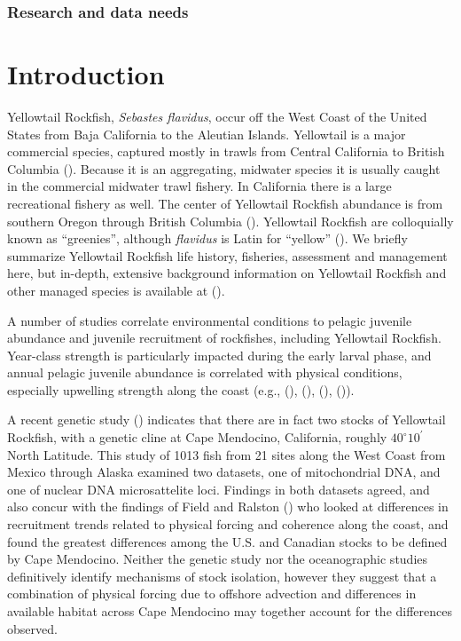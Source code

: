 \documentclass[
]{scrartcl}
\begin{document}
\subsubsection{Research and data needs}\label{research-and-data-needs}

\newpage{}

\section{Introduction}\label{introduction}

Yellowtail Rockfish, \emph{Sebastes flavidus}, occur off the West Coast
of the United States from Baja California to the Aleutian Islands.
Yellowtail is a major commercial species, captured mostly in trawls from
Central California to British Columbia (). Because it is an aggregating, midwater species it is usually
caught in the commercial midwater trawl fishery. In California there is
a large recreational fishery as well. The center of Yellowtail Rockfish
abundance is from southern Oregon through British Columbia
(). Yellowtail Rockfish
are colloquially known as ``greenies'', although \emph{flavidus} is
Latin for ``yellow'' (). We briefly
summarize Yellowtail Rockfish life history, fisheries, assessment and
management here, but in-depth, extensive background information on
Yellowtail Rockfish and other managed species is available at
().

A number of studies correlate environmental conditions to pelagic
juvenile abundance and juvenile recruitment of rockfishes, including
Yellowtail Rockfish. Year-class strength is particularly impacted during
the early larval phase, and annual pelagic juvenile abundance is
correlated with physical conditions, especially upwelling strength along
the coast (e.g., (),
(),
(),
()).

A recent genetic study () indicates that there are in fact two stocks of Yellowtail
Rockfish, with a genetic cline at Cape Mendocino, California, roughly
\(40^\circ 10^\prime\) North Latitude. This study of 1013 fish from 21
sites along the West Coast from Mexico through Alaska examined two
datasets, one of mitochondrial DNA, and one of nuclear DNA
microsattelite loci. Findings in both datasets agreed, and also concur
with the findings of Field and Ralston () who looked at differences in recruitment trends
related to physical forcing and coherence along the coast, and found the
greatest differences among the U.S. and Canadian stocks to be defined by
Cape Mendocino. Neither the genetic study nor the oceanographic studies
definitively identify mechanisms of stock isolation, however they
suggest that a combination of physical forcing due to offshore advection
and differences in available habitat across Cape Mendocino may together
account for the differences observed.
\end{document}
